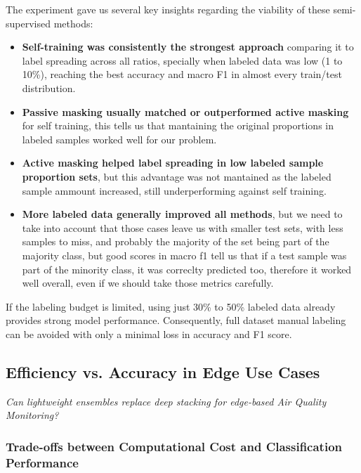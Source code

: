 \documentclass[a4paper,12pt]{article}
\begin{document}
	The experiment gave us several key insights regarding the viability of these semi-supervised methods:
	
	\begin{itemize}
		\item \textbf{Self-training was consistently the strongest approach} comparing it to label spreading across all ratios, specially when labeled data was low (1 to 10\%), reaching the best accuracy and macro F1 in almost every train/test distribution.
		
		\item \textbf{Passive masking usually matched or outperformed active masking} for self training, this tells us that mantaining the original proportions in labeled samples worked well for our problem.
		
		\item \textbf{Active masking helped label spreading in low labeled sample proportion sets}, but this advantage was not mantained as the labeled sample ammount increased, still underperforming against self training.
		
		\item \textbf{More labeled data generally improved all methods}, but we need to take into account that those cases leave us with smaller test sets, with less samples to miss, and probably the majority of the set being part of the majority class, but good scores in macro f1 tell us that if a test sample was part of the minority class, it was correclty predicted too, therefore it worked well overall, even if we should take those metrics carefully.
		
	\end{itemize}
	
	If the labeling budget is limited, using just 30\% to 50\% labeled data already provides strong model performance. Consequently, full dataset manual labeling can be avoided with only a minimal loss in accuracy and F1 score.
	
	
	
	\subsection{Efficiency vs. Accuracy in Edge Use Cases}
	\label{subsec:efficiency}
	
	
	
	\textit{Can lightweight ensembles replace deep stacking for edge-based Air Quality Monitoring?}
	
	\subsubsection{Trade-offs between Computational Cost and Classification Performance}
	
\end{document}
